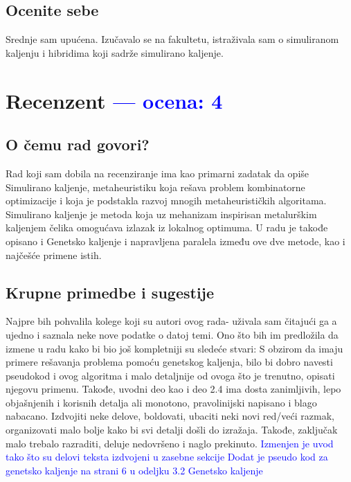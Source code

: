 \documentclass[a4paper]{report}
\newcommand{\odgovor}[1]{\textcolor{blue}{#1}}
\begin{document}
\section{Ocenite sebe}
Srednje sam upućena. Izučavalo se na fakultetu, istraživala sam 
o simuliranom kaljenju i hibridima koji sadrže simulirano kaljenje.
\chapter{Recenzent \odgovor{--- ocena: 4} }


\section{O čemu rad govori?}
Rad koji sam dobila na recenziranje ima kao primarni zadatak da opiše Simulirano kaljenje, metaheuristiku koja rešava problem kombinatorne optimizacije i koja je podstakla razvoj mnogih metaheurističkih algoritama. Simulirano kaljenje je metoda koja uz mehanizam inspirisan metalurškim kaljenjem čelika omogućava izlazak iz lokalnog optimuma. U radu je takođe opisano i Genetsko kaljenje i napravljena paralela između ove dve metode, kao i najčešće primene istih.

\section{Krupne primedbe i sugestije}
Najpre bih pohvalila kolege koji su autori ovog rada- uživala sam čitajući ga a ujedno i saznala neke nove podatke o datoj temi. Ono što bih im predložila da izmene u radu kako bi bio još kompletniji su sledeće stvari: S obzirom da imaju primere rešavanja problema pomoću genetskog kaljenja, bilo bi dobro navesti pseudokod i ovog algoritma i malo detaljnije od ovoga što je trenutno, opisati njegovu primenu. Takođe, uvodni deo kao i deo 2.4 ima dosta zanimljivih, lepo objašnjenih i korisnih detalja ali monotono, pravolinijski napisano i blago nabacano. Izdvojiti neke delove, boldovati, ubaciti neki novi red/veći razmak, organizovati malo bolje kako bi svi detalji došli do izražaja.
Takođe, zaključak malo trebalo razraditi, deluje nedovršeno i naglo prekinuto.
\odgovor {Izmenjen je uvod tako što su delovi teksta izdvojeni u zasebne sekcije}
\odgovor {Dodat je pseudo kod za genetsko kaljenje na strani 6 u odeljku 3.2 Genetsko kaljenje}
\end{document}
